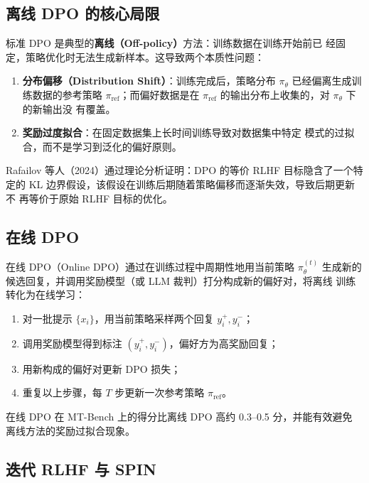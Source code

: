 \documentclass[12pt,a4paper,UTF8]{ctexart}
\begin{document}
\subsection{离线 DPO 的核心局限}

标准 DPO 是典型的\textbf{离线（Off-policy）}方法：训练数据在训练开始前已
经固定，策略优化时无法生成新样本。这导致两个本质性问题：

\begin{enumerate}[leftmargin=2em]
  \item \textbf{分布偏移（Distribution Shift）}：训练完成后，策略分布 $\pi_\theta$
    已经偏离生成训练数据的参考策略 $\pi_{\mathrm{ref}}$；而偏好数据是在
    $\pi_{\mathrm{ref}}$ 的输出分布上收集的，对 $\pi_\theta$ 下的新输出没
    有覆盖。
  \item \textbf{奖励过度拟合}：在固定数据集上长时间训练导致对数据集中特定
    模式的过拟合，而不是学习到泛化的偏好原则。
\end{enumerate}

Rafailov 等人（2024）通过理论分析证明：DPO 的等价 RLHF 目标隐含了一个特
定的 KL 边界假设，该假设在训练后期随着策略偏移而逐渐失效，导致后期更新不
再等价于原始 RLHF 目标的优化。

\subsection{在线 DPO}

在线 DPO（Online DPO）通过在训练过程中周期性地用当前策略 $\pi_\theta^{(t)}$
生成新的候选回复，并调用奖励模型（或 LLM 裁判）打分构成新的偏好对，将离线
训练转化为在线学习：

\begin{enumerate}[leftmargin=2em]
  \item 对一批提示 $\{x_i\}$，用当前策略采样两个回复 $y_i^+, y_i^-$；
  \item 调用奖励模型得到标注 $(y_i^+, y_i^-)$，偏好方为高奖励回复；
  \item 用新构成的偏好对更新 DPO 损失；
  \item 重复以上步骤，每 $T$ 步更新一次参考策略 $\pi_{\mathrm{ref}}$。
\end{enumerate}

在线 DPO 在 MT-Bench 上的得分比离线 DPO 高约 0.3--0.5 分，并能有效避免
离线方法的奖励过拟合现象。

\subsection{迭代 RLHF 与 SPIN}
\end{document}
